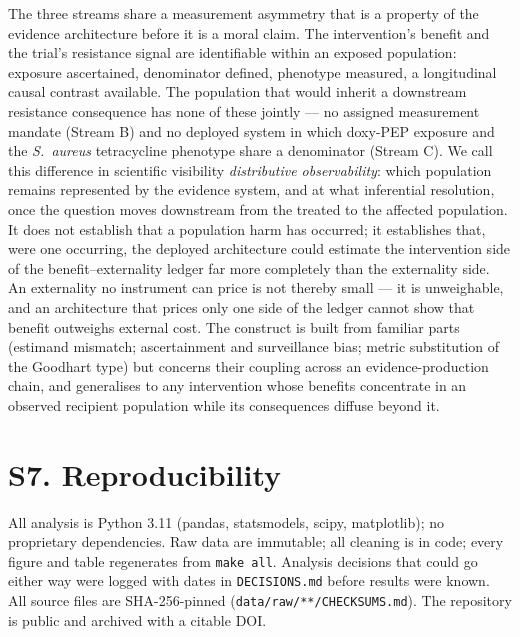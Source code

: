 \documentclass[11pt,a4paper]{article}
\newcommand{\sa}{\emph{S.~aureus}}
\begin{document}
The three streams share a measurement asymmetry that is a property of the
evidence architecture before it is a moral claim. The intervention's benefit and
the trial's resistance signal are identifiable within an exposed population:
exposure ascertained, denominator defined, phenotype measured, a longitudinal
causal contrast available. The population that would inherit a downstream
resistance consequence has none of these jointly --- no assigned measurement
mandate (Stream B) and no deployed system in which doxy-PEP exposure and the
\sa{} tetracycline phenotype share a denominator (Stream C). We call this
difference in scientific visibility \emph{distributive observability}: which
population remains represented by the evidence system, and at what inferential
resolution, once the question moves downstream from the treated to the affected
population. It does not establish that a population harm has occurred; it
establishes that, were one occurring, the deployed architecture could estimate the
intervention side of the benefit--externality ledger far more completely than the
externality side. An externality no instrument can price is not thereby small ---
it is unweighable, and an architecture that prices only one side of the ledger
cannot show that benefit outweighs external cost. The construct is built from
familiar parts (estimand mismatch; ascertainment and surveillance bias;
metric substitution of the Goodhart type) but concerns their coupling across an
evidence-production chain, and generalises to any intervention whose benefits
concentrate in an observed recipient population while its consequences diffuse
beyond it.

\section*{S7. Reproducibility}

All analysis is Python 3.11 (pandas, statsmodels, scipy, matplotlib); no
proprietary dependencies. Raw data are immutable; all cleaning is in code; every
figure and table regenerates from \texttt{make all}. Analysis decisions that could
go either way were logged with dates in \texttt{DECISIONS.md} before results were
known. All source files are SHA-256-pinned (\texttt{data/raw/**/CHECKSUMS.md}).
The repository is public and archived with a citable DOI.
\end{document}
